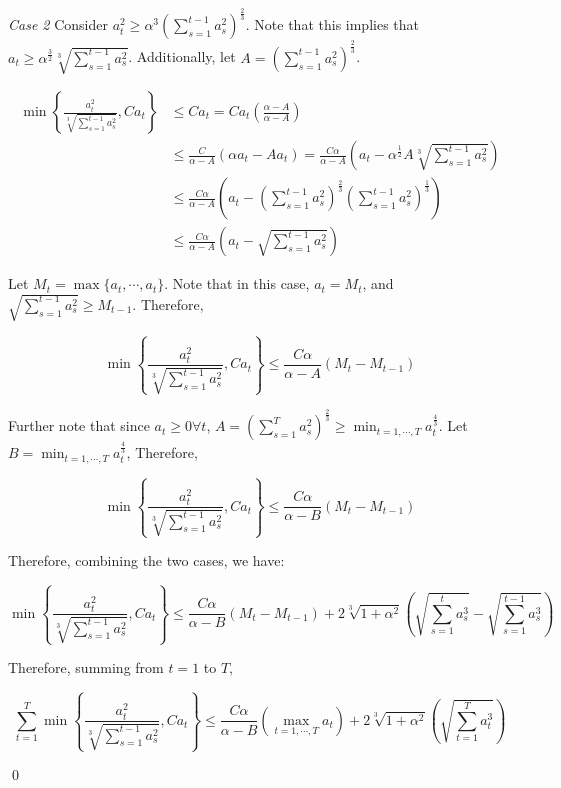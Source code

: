 \documentclass{article}
\begin{document}
\emph{Case 2} Consider $a_{t}^2 \geq \alpha^3 \left(\sum\limits_{s=1}^{t-1} a_{s}^2\right)^\frac{2}{3}$. Note that this
implies that $a_t \geq \alpha^\frac{3}{2} \sqrt[3]{\sum\limits_{s=1}^{t-1} a_{s}^2}$. Additionally, let 
$A = \left( \sum\limits_{s=1}^{t-1} a_{s}^2 \right)^\frac{2}{3}$.


\begin{align*}
  \min \left\{ \frac{a_{t}^2}{\sqrt[3]{\sum\limits_{s=1}^{t-1} a_{s}^2}}, C a_t \right\}
  &\leq C a_t = C a_t \left(\frac{\alpha - A}{\alpha -A}\right) \\
  &\leq \frac{C}{\alpha - A}\left(\alpha a_t - A a_t\right) = \frac{C \alpha}{\alpha - A}\left(a_t - \alpha^\frac{1}{2}
    A \sqrt[3]{\sum\limits_{s=1}^{t-1} a_{s}^2}\right) \\
  &\leq \frac{C \alpha}{\alpha - A}\left(a_t - \left( \sum\limits_{s=1}^{t-1} a_{s}^2 \right)^\frac{2}{3}
  \left(\sum\limits_{s=1}^{t-1} a_{s}^2\right)^\frac{1}{3}\right) \\
  &\leq \frac{C \alpha}{\alpha - A}\left(a_t - \sqrt{\sum\limits_{s=1}^{t-1} a_{s}^2}\right)
\end{align*}

Let $M_t = \max \{a_t, \cdots, a_t\}$. Note that in this case, $a_t = M_t$, and $\sqrt{\sum\limits_{s=1}^{t-1} a_{s}^2}
\geq M_{t-1}$. Therefore,

\[
  \min \left\{ \frac{a_{t}^2}{\sqrt[3]{\sum\limits_{s=1}^{t-1} a_{s}^2}}, C a_t \right\} \leq 
  \frac{C \alpha}{\alpha - A}\left(M_t - M_{t-1}\right)
\]

Further note that since $a_t \geq 0 \forall t$, $A = (\sum\limits_{s=1}^T a_{s}^2)^\frac{2}{3} \geq
\min_{t=1,\cdots,T}a_{t}^\frac{4}{3}$. Let $B = \min_{t=1,\cdots,T}a_{t}^\frac{4}{3}$, Therefore,

\[
  \min \left\{ \frac{a_{t}^2}{\sqrt[3]{\sum\limits_{s=1}^{t-1} a_{s}^2}}, C a_t \right\} \leq 
  \frac{C \alpha}{\alpha - B}\left(M_t - M_{t-1}\right)
\]

Therefore, combining the two cases, we have:

\[
  \min \left\{ \frac{a_{t}^2}{\sqrt[3]{\sum\limits_{s=1}^{t-1} a_{s}^2}}, C a_t \right\} \leq \frac{C \alpha}{\alpha -
  B}\left(M_t - M_{t-1}\right) + 2 \sqrt[3]{1 + \alpha^2}\left(\sqrt{\sum\limits_{s=1}^t a_{s}^3} -
  \sqrt{\sum\limits_{s=1}^{t-1} a_{s}^3}\right)
\]

Therefore, summing from $t=1$ to $T$,

\[
  \sum\limits_{t=1}^T\min \left\{ \frac{a_{t}^2}{\sqrt[3]{\sum\limits_{s=1}^{t-1} a_{s}^2}}, C a_t \right\} \leq \frac{C
  \alpha}{\alpha - B}\left(\max\limits_{t=1, \cdots, T} a_t\right) + 2 \sqrt[3]{1 +
  \alpha^2}\left(\sqrt{\sum\limits_{t=1}^T a_{t}^3}\right)
\]

\qed
\end{document}
